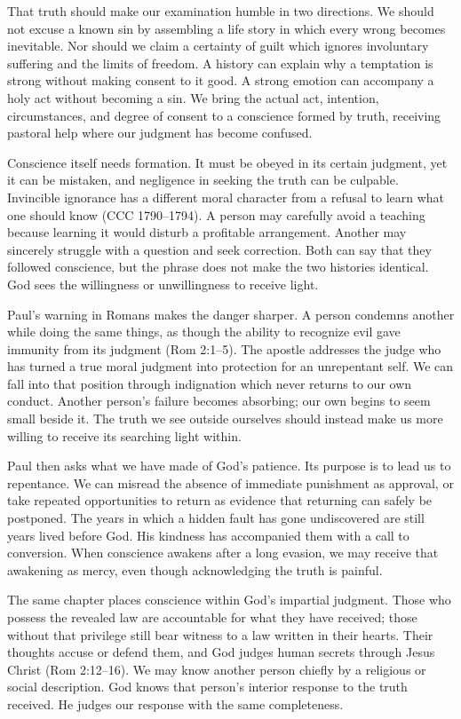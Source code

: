 That truth should make our examination humble in two directions. We should not excuse a known sin by assembling a life story in which every wrong becomes inevitable. Nor should we claim a certainty of guilt which ignores involuntary suffering and the limits of freedom. A history can explain why a temptation is strong without making consent to it good. A strong emotion can accompany a holy act without becoming a sin. We bring the actual act, intention, circumstances, and degree of consent to a conscience formed by truth, receiving pastoral help where our judgment has become confused.

Conscience itself needs formation. It must be obeyed in its certain judgment, yet it can be mistaken, and negligence in seeking the truth can be culpable. Invincible ignorance has a different moral character from a refusal to learn what one should know (CCC 1790--1794). A person may carefully avoid a teaching because learning it would disturb a profitable arrangement. Another may sincerely struggle with a question and seek correction. Both can say that they followed conscience, but the phrase does not make the two histories identical. God sees the willingness or unwillingness to receive light.

Paul's warning in Romans makes the danger sharper. A person condemns another while doing the same things, as though the ability to recognize evil gave immunity from its judgment (Rom 2:1--5). The apostle addresses the judge who has turned a true moral judgment into protection for an unrepentant self. We can fall into that position through indignation which never returns to our own conduct. Another person's failure becomes absorbing; our own begins to seem small beside it. The truth we see outside ourselves should instead make us more willing to receive its searching light within.

Paul then asks what we have made of God's patience. Its purpose is to lead us to repentance. We can misread the absence of immediate punishment as approval, or take repeated opportunities to return as evidence that returning can safely be postponed. The years in which a hidden fault has gone undiscovered are still years lived before God. His kindness has accompanied them with a call to conversion. When conscience awakens after a long evasion, we may receive that awakening as mercy, even though acknowledging the truth is painful.

The same chapter places conscience within God's impartial judgment. Those who possess the revealed law are accountable for what they have received; those without that privilege still bear witness to a law written in their hearts. Their thoughts accuse or defend them, and God judges human secrets through Jesus Christ (Rom 2:12--16). We may know another person chiefly by a religious or social description. God knows that person's interior response to the truth received. He judges our response with the same completeness.

